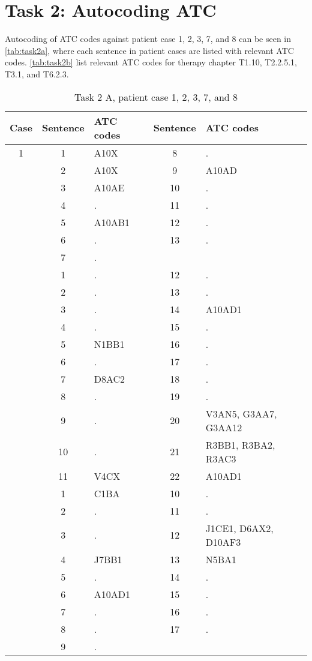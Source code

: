 \section{Task 2: Autocoding ATC}
Autocoding of ATC codes against patient case 1, 2, 3, 7, and 8 can be seen in
\autoref{tab:task2a}, where each sentence in patient cases are listed with
relevant ATC codes. \autoref{tab:task2b} list relevant ATC codes for therapy
chapter T1.10, T2.2.5.1, T3.1, and T6.2.3.
\begin{table}[htbp] \footnotesize \center
\caption{Task 2 A, patient case 1, 2, 3, 7, and 8\label{tab:task2a}}
\begin{tabular}{c c l c l}
    \toprule
    Case & Sentence & ATC codes & Sentence & ATC codes \\
    \midrule
	1 & 1 & A10X & 8 & . \\
	 & 2 & A10X & 9 & A10AD \\
	 & 3 & A10AE & 10 & . \\
	 & 4 & . & 11 & . \\
	 & 5 & A10AB1 & 12 & . \\
	 & 6 & . & 13 & . \\
	 & 7 & . & & \\
	\addlinespace
	2 & 1 & . & 12 & . \\
	 & 2 & . & 13 & . \\
	 & 3 & . & 14 & A10AD1 \\
	 & 4 & . & 15 & . \\
	 & 5 & N1BB1 & 16 & . \\
	 & 6 & . & 17 & . \\
	 & 7 & D8AC2 & 18 & . \\
	 & 8 & . & 19 & . \\
	 & 9 & . & 20 & V3AN5, G3AA7, G3AA12 \\
	 & 10 & . & 21 & R3BB1, R3BA2, R3AC3 \\
	 & 11 & V4CX & 22 & A10AD1 \\
	\addlinespace
	3 & 1 & C1BA & 10 & . \\
	 & 2 & . & 11 & . \\
	 & 3 & . & 12 & J1CE1, D6AX2, D10AF3 \\
	 & 4 & J7BB1 & 13 & N5BA1 \\
	 & 5 & . & 14 & . \\
	 & 6 & A10AD1 & 15 & . \\
	 & 7 & . & 16 & . \\
	 & 8 & . & 17 & . \\
	 & 9 & . & & \\

\end{tabular}
\end{table}
